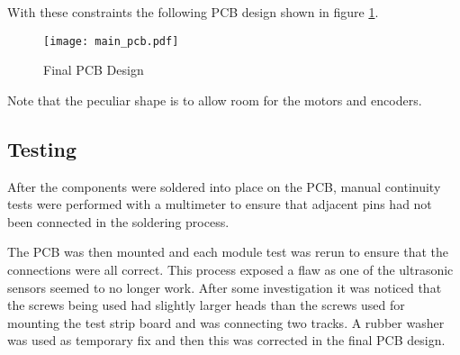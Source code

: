 
With these constraints the following PCB design shown in figure \ref{PCB_Design}.

\begin{figure}[!ht]
	\centering
	\texttt{[image: main\_pcb.pdf]}
	\caption{Final PCB Design}\label{PCB_Design}

\end{figure}
Note that the peculiar shape is to allow room for the motors and encoders.

\subsection{Testing}\label{elec/pcb/test}
After the components were soldered into place on the PCB, manual
continuity tests were performed with a multimeter to ensure that adjacent
pins had not been connected in the soldering process.

The PCB was then mounted and each module test was rerun to ensure that the
connections were all correct. This process exposed a flaw as one of the
ultrasonic sensors seemed to no longer work. After some investigation it
was noticed that the screws being used had slightly larger heads than the
screws used for mounting the test strip board and was connecting two
tracks. A rubber washer was used as temporary fix and then this was
corrected in the final PCB design.
